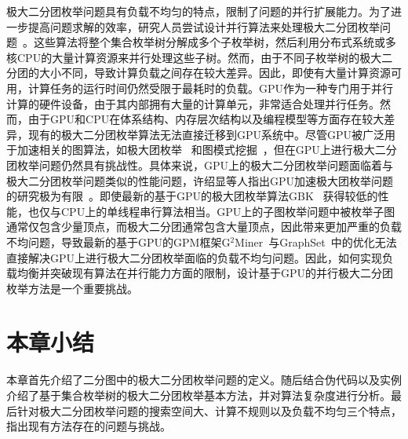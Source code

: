 极大二分团枚举问题具有负载不均匀的特点，限制了问题的并行扩展能力。为了进一步提高问题求解的效率，研究人员尝试设计并行算法来处理极大二分团枚举问题~\cite{mapreduceMBE16, MBEHe18, parMBE19}。这些算法将整个集合枚举树分解成多个子枚举树，然后利用分布式系统或多核CPU的大量计算资源来并行处理这些子树。然而，由于不同子枚举树的极大二分团的大小不同，导致计算负载之间存在较大差异。因此，即使有大量计算资源可用，计算任务的运行时间仍然受限于最耗时的负载。GPU作为一种专门用于并行计算的硬件设备，由于其内部拥有大量的计算单元，非常适合处理并行任务。然而，由于GPU和CPU在体系结构、内存层次结构以及编程模型等方面存在较大差异，现有的极大二分团枚举算法无法直接迁移到GPU系统中。尽管GPU被广泛用于加速相关的图算法，如极大团枚举~\cite{MCEGPUBitset13,MCEGPUdpp17,MCE-GPU21} 和图模式挖掘~\cite{g2miner22,SubgraphGpu22,Kclique22,stmatch22}，但在GPU上进行极大二分团枚举问题仍然具有挑战性。具体来说，GPU上的极大二分团枚举问题面临着与极大二分团枚举问题类似的性能问题，许绍显等人指出GPU加速极大团枚举问题的研究极为有限~\cite{MCEreview22}。即使最新的基于GPU的极大团枚举算法GBK~\cite{MCE-GPU21} 获得较低的性能，也仅与CPU上的单线程串行算法相当。GPU上的子图枚举问题中被枚举子图通常仅包含少量顶点，而极大二分团通常包含大量顶点，因此带来更加严重的负载不均问题，导致最新的基于GPU的GPM框架G$^2$Miner~\cite{g2miner22}与GraphSet~\cite{Graphset23}中的优化无法直接解决GPU上进行极大二分团枚举面临的负载不均匀问题。因此，如何实现负载均衡并突破现有算法在并行能力方面的限制，设计基于GPU的并行极大二分团枚举方法是一个重要挑战。



\section{本章小结}

本章首先介绍了二分图中的极大二分团枚举问题的定义。随后结合伪代码以及实例介绍了基于集合枚举树的极大二分团枚举基本方法，并对算法复杂度进行分析。最后针对极大二分团枚举问题的搜索空间大、计算不规则以及负载不均匀三个特点，指出现有方法存在的问题与挑战。